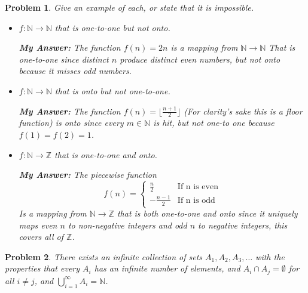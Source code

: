 \documentclass[12pt]{article}
\newtheorem{problem}{Problem}
\newcommand{\NN}{\ensuremath{\mathbb N}}
\newcommand{\ZZ}{\ensuremath{\mathbb Z}}
\begin{document}
\begin{problem} %
Give an example of each, or state that it is impossible.
\begin{itemize}
\item[(a)] $f:\NN\to\NN$ that is one-to-one but not onto.

	\textbf{My Answer: } The function $f(n) = 2n$ is a mapping from $\NN \rightarrow \NN$ That is one-to-one since distinct $n$ produce distinct even numbers, but not onto because it misses odd numbers.
\item[(b)] $f:\NN\to\NN$ that is onto but not one-to-one.

	\textbf{My Answer: } The function $f(n) = \lfloor\frac{n+1}{2}\rfloor$ (For clarity's sake this is a floor function) is onto since every $m \in \NN$ is hit, but not one-to one because $f(1) = f(2) = 1 $. 
\item[(d)] $f:\NN\to\ZZ$ that is one-to-one and onto.

	\textbf{My Answer: } The piecewise function $$f(n) =\begin{cases} \frac{n}{2} & \text{If n is even} \\
	-\frac{n-1}{2} & \text{If n is odd}\end{cases} $$
		Is a mapping from $\NN \rightarrow \ZZ$ that is both one-to-one and onto since it uniquely maps even $n$ to non-negative integers and odd $n$ to negative integers, this covers all of $\ZZ$.
	

\end{itemize}
\end{problem}



\begin{problem} %
There exists an infinite collection of sets $A_1,A_2,A_3,\dots$ with the properties that every $A_i$ has an infinite number of elements, and $A_i\cap A_j=\emptyset$ for all $i\ne j$, and $\bigcup_{i=1}^\infty A_i=\NN$. \end{problem}
\end{document}
